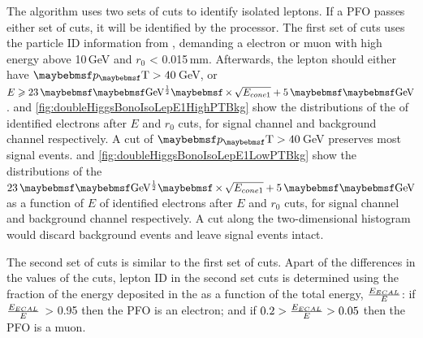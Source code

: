 The algorithm uses two sets of cuts to identify isolated leptons. If a PFO passes either set of cuts, it will be identified by the processor. The first set of cuts uses the particle ID information from \pandora, demanding a \pandora electron or muon with high energy above 10\,GeV and $r_0$ < 0.015\,mm. Afterwards, the lepton should either have $\pT > 40$\,GeV, or $E \geqslant 23\,\uprightMath{GeV^{\frac{1}{2}}} \times \sqrt{E_{cone1}} + 5\,\uprightMath{GeV}$.  and \ref{fig:doubleHiggsBonoIsoLepE1HighPTBkg} show the distributions of the \pT of identified electrons after  $E$  and $r_0$ cuts, for  \eeToHHbbWWHad signal channel and \eeTo{ \Pquark \Pquark \Pquark \Pquark \Plepton \Pnu}  background channel respectively. A cut of $\pT > 40$\,GeV preserves most signal events.  and \ref{fig:doubleHiggsBonoIsoLepE1LowPTBkg} show the distributions of the $23\,\uprightMath{GeV^{\frac{1}{2}}} \times \sqrt{E_{cone1}} + 5\,\uprightMath{GeV}$ as a function of $E$ of identified electrons after  $E$  and $r_0$ cuts, for  \eeToHHbbWWHad signal channel and \eeTo{ \Pquark \Pquark \Pquark \Pquark \Plepton \Pnu}  background channel respectively. A cut along the two-dimensional histogram would discard background events and leave signal events intact.


The second set of cuts is similar to the first set of cuts. Apart of the differences in the values of the cuts, lepton ID in the second set cuts is determined using the fraction of the energy deposited in the \ECAL as a function of the total energy,  $\frac{E_{ECAL}}{E}$: if $\frac{E_{ECAL}}{E}$  > 0.95 then the PFO is an electron; and if  $0.2 > \frac{E_{ECAL}}{E} > 0.05$  then the PFO is a muon.





